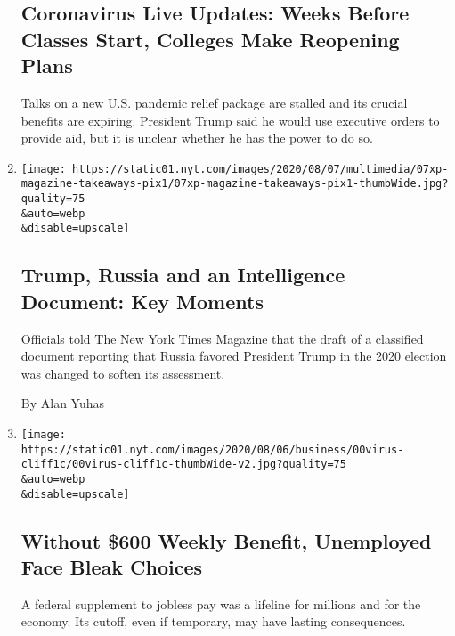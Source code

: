 \begin{enumerate}
  \hypertarget{coronavirus-live-updates-weeks-before-classes-start-colleges-make-reopening-plans}{%
  \subsection{Coronavirus Live Updates: Weeks Before Classes Start,
  Colleges Make Reopening
  Plans}\label{coronavirus-live-updates-weeks-before-classes-start-colleges-make-reopening-plans}}

  Talks on a new U.S. pandemic relief package are stalled and its
  crucial benefits are expiring. President Trump said he would use
  executive orders to provide aid, but it is unclear whether he has the
  power to do so.
\item
  \href{/2020/08/08/us/politics/trump-russia.html}{}

  \texttt{[image: https://static01.nyt.com/images/2020/08/07/multimedia/07xp-magazine-takeaways-pix1/07xp-magazine-takeaways-pix1-thumbWide.jpg?quality=75\\\&auto=webp\\\&disable=upscale]}

  \hypertarget{trump-russia-and-an-intelligence-document-key-moments}{%
  \subsection{Trump, Russia and an Intelligence Document: Key
  Moments}\label{trump-russia-and-an-intelligence-document-key-moments}}

  Officials told The New York Times Magazine that the draft of a
  classified document reporting that Russia favored President Trump in
  the 2020 election was changed to soften its assessment.

  By Alan Yuhas
\item
  \href{/2020/08/08/business/economy/lost-unemployment-benefits.html}{}

  \texttt{[image: https://static01.nyt.com/images/2020/08/06/business/00virus-cliff1c/00virus-cliff1c-thumbWide-v2.jpg?quality=75\\\&auto=webp\\\&disable=upscale]}

  \hypertarget{without-600-weekly-benefit-unemployed-face-bleak-choices}{%
  \subsection{Without \$600 Weekly Benefit, Unemployed Face Bleak
  Choices}\label{without-600-weekly-benefit-unemployed-face-bleak-choices}}

  A federal supplement to jobless pay was a lifeline for millions and
  for the economy. Its cutoff, even if temporary, may have lasting
  consequences.


\end{enumerate}
